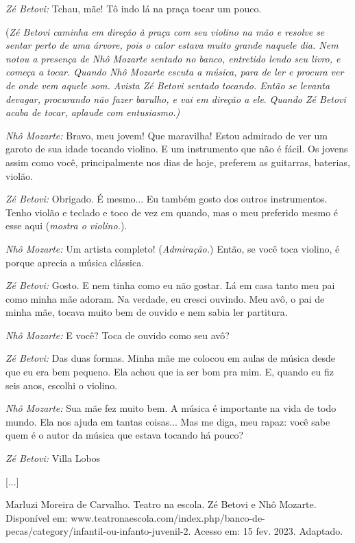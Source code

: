 \emph{Zé Betovi:} Tchau, mãe! Tô indo lá na praça tocar um pouco.

\protect\hypertarget{_Hlk35856697}{}{}(\emph{Zé Betovi caminha em
direção à praça com seu violino na mão e resolve se sentar perto de uma
árvore, pois o calor estava muito grande naquele dia. Nem notou a
presença de Nhô Mozarte sentado no banco, entretido lendo seu livro, e
começa a tocar. Quando Nhô Mozarte escuta a música, para de ler e
procura ver de onde vem aquele som. Avista Zé Betovi sentado tocando.
Então se levanta devagar, procurando não fazer barulho, e vai em direção
a ele}. \emph{Quando Zé Betovi acaba de tocar, aplaude com entusiasmo.)}

\emph{Nhô Mozarte:} Bravo, meu jovem! Que maravilha! Estou admirado de
ver um garoto de sua idade tocando violino. E um instrumento que não é
fácil. Os jovens assim como você, principalmente nos dias de hoje,
preferem as guitarras, baterias, violão.

\emph{Zé Betovi:} Obrigado. É mesmo... Eu também gosto dos outros
instrumentos. Tenho violão e teclado e toco de vez em quando, mas o meu
preferido mesmo é esse aqui (\emph{mostra o violino.}).

\emph{Nhô Mozarte:} Um artista completo! (\emph{Admiração.}) Então, se
você toca violino, é porque aprecia a música clássica.

\emph{Zé Betovi:} Gosto. E nem tinha como eu não gostar. Lá em casa
tanto meu pai como minha mãe adoram. Na verdade, eu cresci ouvindo. Meu
avô, o pai de minha mãe, tocava muito bem de ouvido e nem sabia ler
partitura.

\emph{Nhô Mozarte:} E você? Toca de ouvido como seu avô?

\emph{Zé Betovi:} Das duas formas. Minha mãe me colocou em aulas de
música desde que eu era bem pequeno. Ela achou que ia ser bom pra mim.
E, quando eu fiz seis anos, escolhi o violino.

\emph{Nhô Mozarte:} Sua mãe fez muito bem. A música é importante na vida
de todo mundo. Ela nos ajuda em tantas coisas... Mas me diga, meu rapaz:
você sabe quem é o autor da música que estava tocando há pouco?

\emph{Zé Betovi:} Villa Lobos

{[}...{]}

Marluzi Moreira de Carvalho. Teatro na escola. Zé Betovi e Nhô Mozarte.
Disponível em:
www.teatronaescola.com/index.php/banco-de-pecas/category/infantil-ou-infanto-juvenil-2.
Acesso em: 15 fev. 2023. Adaptado.

